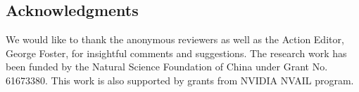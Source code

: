 \documentclass[11pt,a4paper]{article}
\begin{document}
\begin{CJK*}{UTF8}{gbsn}
\section*{Acknowledgments}

We would like to thank the anonymous reviewers as well as the Action Editor, George Foster, for insightful comments and suggestions. 
The research work has been funded by the Natural Science Foundation of China under Grant No. 61673380.
This work is also supported by grants from NVIDIA NVAIL program.





\end{CJK*}
\end{document}
